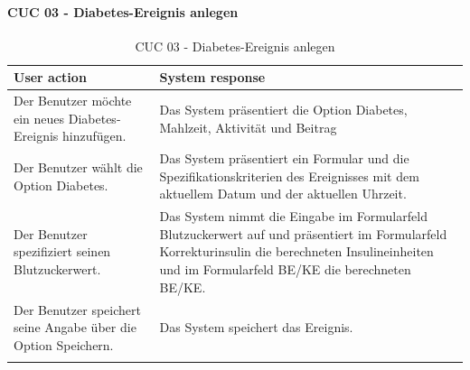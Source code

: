 \paragraph{CUC 03 - Diabetes-Ereignis anlegen}
\begin{center}
	\begin{longtable}[H]{|p{6cm}|p{6cm}|}
		\hline
		\textbf{User action} & \textbf{System response}\\
		\hline
		Der Benutzer möchte ein neues Diabetes-Ereignis hinzufügen. & Das System präsentiert die Option \glqq Diabetes\grqq{}, \glqq Mahlzeit\grqq{}, \glqq Aktivität\grqq{} und \glqq Beitrag\grqq{}\\
		\hline
		Der Benutzer wählt die Option \glqq Diabetes\grqq{}. & Das System präsentiert ein Formular und die Spezifikationskriterien des Ereignisses mit dem aktuellem Datum und der aktuellen Uhrzeit.\\
		\hline
		Der Benutzer spezifiziert seinen Blutzuckerwert. & Das System nimmt die Eingabe im Formularfeld \glqq Blutzuckerwert\grqq{} auf und präsentiert im Formularfeld \glqq Korrekturinsulin\grqq{} die berechneten Insulineinheiten und im Formularfeld \glqq BE\grqq{}/\glqq KE\grqq{} die berechneten BE/KE.\\
		\hline
		Der Benutzer speichert seine Angabe über die Option \glqq Speichern\grqq{}. & Das System speichert das Ereignis.\\
		\hline
		\captionsetup{justification=centering}
		\caption{CUC 03 - Diabetes-Ereignis anlegen}
		\label{tab:Persona Use Cases 3}
	\end{longtable}
\end{center}
